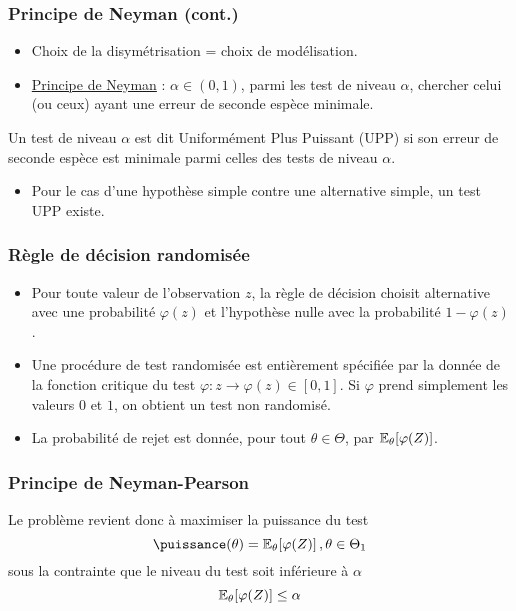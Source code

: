 \begin{frame}
\frametitle{Principe de Neyman (cont.)}
\begin{itemize}
\item Choix de la  disymétrisation  = choix de modélisation.
\item \underline{\alert{Principe de Neyman}}  : $\alpha \in (0,1)$, parmi les test de niveau $\alpha$, chercher celui (ou ceux) ayant \alert{une erreur de seconde espèce minimale}.
\end{itemize}
\begin{df}
Un test de niveau $\alpha$ est dit \alert{Uniformément Plus Puissant} (UPP) si son erreur de seconde espèce est minimale parmi celles des tests de niveau $\alpha$.
\end{df}
\begin{itemize}
\item Pour le cas d'une \alert{hypothèse simple} contre une \alert{alternative simple}, un test UPP existe.
\end{itemize}
\end{frame}

\begin{frame}
\frametitle{Règle de décision randomisée}
\begin{itemize}
\item Pour toute valeur de l'observation $z$, la règle de décision choisit alternative avec une probabilité $\varphi(z)$ et l'hypothèse nulle avec la probabilité $1 - \varphi(z)$.
\item Une procédure de test randomisée est \alert{entièrement spécifiée} par la donnée de la \alert{fonction critique} du test $\varphi: z \to \varphi(z) \in [0,1]$. Si $\varphi$ prend simplement les valeurs $0$ et $1$, on obtient un test non randomisé. 
\item La \alert{probabilité de rejet} est donnée, pour tout $\theta \in \Theta$, par $\operatorname{{\mathbb E}}_\theta[\varphi(Z)]$.
\end{itemize}
\end{frame}

\begin{frame}
\frametitle{Principe de Neyman-Pearson}
Le problème revient donc à maximiser la \alert{puissance du test}
\[
\puissance(\truetheta)= \PE_{\theta}[\varphi(Z)] \eqsp, \truetheta \in \Theta_1
\]
sous la contrainte que le niveau du test soit inférieure à $\alpha$
\[
\operatorname{{\mathbb E}}_\theta[\varphi(Z)] \leq \alpha 
\]
\end{frame}


